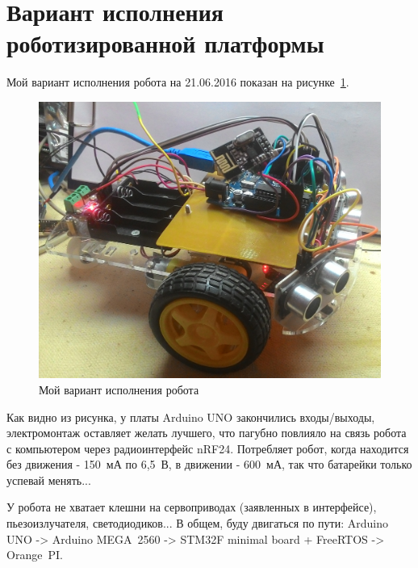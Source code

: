 \section{Вариант исполнения роботизированной платформы}

Мой вариант исполнения робота на 21.06.2016 показан на рисунке~\ref{p:robo_arduino_uno}.

\begin{figure}[H]\center
  \captionsetup{singlelinecheck=true} %
  \includegraphics*[scale=0.2]{about/images/robo_arduino_uno}
  \caption{Мой вариант исполнения робота} \label{p:robo_arduino_uno}
\end{figure}

Как видно из рисунка, у платы Arduino UNO закончились входы/выходы, электромонтаж оставляет желать лучшего, что пагубно повлияло на связь робота с компьютером через радиоинтерфейс nRF24. Потребляет робот, когда находится без движения - 150~мА по 6,5~В, в движении - 600~мА, так что батарейки только успевай менять...

У робота не хватает клешни на сервоприводах (заявленных в интерфейсе), пьезоизлучателя, светодиодиков...  В общем, буду двигаться по пути: Arduino UNO -> Arduino MEGA~2560 -> STM32F minimal board + FreeRTOS -> Orange~PI.